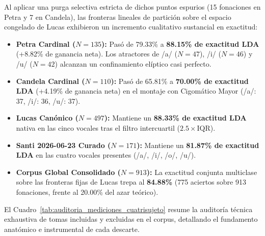 \documentclass[11pt,a4paper,openany]{book}
\theoremstyle{definition}
\begin{document}
Al aplicar una purga selectiva estricta de dichos puntos espurios (15 fonaciones en Petra y 7 en Candela), las fronteras lineales de partición sobre el espacio congelado de Lucas exhibieron un incremento cualitativo sustancial en exactitud:
\begin{itemize}
    \item \textbf{Petra Cardinal ($N=135$):} Pasó de 79.33\% a \textbf{88.15\% de exactitud LDA} (+8.82\% de ganancia neta). Los atractores de /a/ ($N=47$), /i/ ($N=46$) y /u/ ($N=42$) alcanzan un confinamiento elíptico casi perfecto.
    \item \textbf{Candela Cardinal ($N=110$):} Pasó de 65.81\% a \textbf{70.00\% de exactitud LDA} (+4.19\% de ganancia neta) en el montaje con Cigomático Mayor (/a/: 37, /i/: 36, /u/: 37).
    \item \textbf{Lucas Canónico ($N=497$):} Mantiene un \textbf{88.33\% de exactitud LDA} nativa en las cinco vocales tras el filtro intercuartil ($2.5 \times \text{IQR}$).
    \item \textbf{Santi 2026-06-23 Curado ($N=171$):} Mantiene un \textbf{81.87\% de exactitud LDA} en las cuatro vocales presentes (/a/, /i/, /o/, /u/).
    \item \textbf{Corpus Global Consolidado ($N=913$):} La exactitud conjunta multiclase sobre las fronteras fijas de Lucas trepa al \textbf{84.88\%} (775 aciertos sobre 913 fonaciones, frente al 20.00\% del azar teórico).
\end{itemize}

El Cuadro~\ref{tab:auditoria_mediciones_cuatrisujeto} resume la auditoría técnica exhaustiva de tomas incluidas y excluidas en el corpus, detallando el fundamento anatómico e instrumental de cada descarte.
\end{document}
